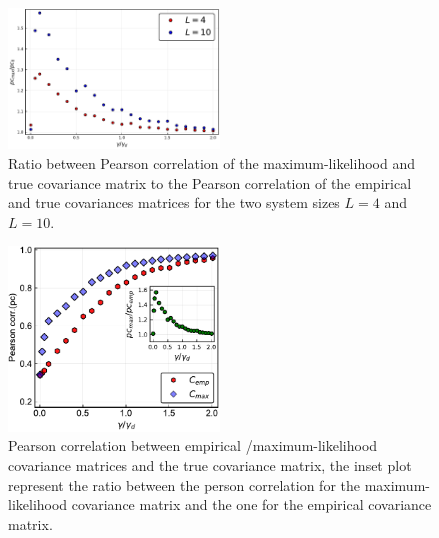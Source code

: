 \documentclass[preprint,amsmath,amssymb,superscriptaddress,showpacs,pre]{revtex4-1}
\begin{document}
\begin{figure}[!htb]
	\centering
	\includegraphics[keepaspectratio=true,width=0.5\textwidth]{Figures/Pearson_correlation_rate_full_range.pdf}
	\caption{  Ratio between Pearson correlation of the  maximum-likelihood  and true covariance  matrix to the Pearson correlation of the  empirical and true covariances matrices for the two system sizes $L=4$ and $L=10$.}
	\label{fig:pearson_corr_comp_L4}
\end{figure}

\begin{figure}[!htb]
	\centering
	\includegraphics[keepaspectratio=true,width=0.5\textwidth]{Figures/corr_C_L10_balanced_tree_100_rep.pdf}
	\caption{ Pearson correlation between empirical /maximum-likelihood   covariance matrices and the true covariance matrix, the inset plot represent the ratio between the person correlation for the  maximum-likelihood covariance matrix and the one for the empirical covariance matrix.}
	\label{fig:pears_L10}
\end{figure}
\end{document}
